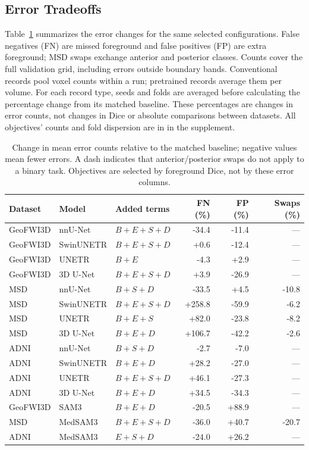 \documentclass[12pt,a4paper]{article}
\begin{document}
\subsection{Error Tradeoffs}
\label{sec:complete-error-tables}
Table~\ref{tab:selected-error-tradeoffs} summarizes the error changes
for the same selected configurations. False negatives (FN) are missed
foreground and false positives (FP) are extra foreground; MSD swaps
exchange anterior and posterior classes. Counts cover the full validation
grid, including errors outside boundary bands. Conventional records pool
voxel counts within a run; pretrained records average them per volume.
For each record type, seeds and folds are averaged before calculating
the percentage change from its matched baseline. These percentages are
changes in error counts, not changes in Dice or absolute comparisons
between datasets. All objectives' counts and fold dispersion are in
 in the supplement.

\begin{table}[htbp]
\centering\footnotesize{}
\setlength{\tabcolsep}{4pt}\renewcommand{\arraystretch}{1.15}
\begin{tabular}{@{}lllrrr@{}}
\hline
Dataset & Model & Added terms & FN (\%) & FP (\%) & Swaps (\%) \\
\hline
GeoFWI3D & nnU-Net & $B+E+S+D$ & -34.4 & -11.4 & --- \\
GeoFWI3D & SwinUNETR & $B+E+S+D$ & +0.6 & -12.4 & --- \\
GeoFWI3D & UNETR & $B+E$ & -4.3 & +2.9 & --- \\
GeoFWI3D & 3D U-Net & $B+E+S+D$ & +3.9 & -26.9 & --- \\
MSD & nnU-Net & $B+S+D$ & -33.5 & +4.5 & -10.8 \\
MSD & SwinUNETR & $B+E+S+D$ & +258.8 & -59.9 & -6.2 \\
MSD & UNETR & $B+E+S$ & +82.0 & -23.8 & -8.2 \\
MSD & 3D U-Net & $B+E+D$ & +106.7 & -42.2 & -2.6 \\
ADNI & nnU-Net & $B+S+D$ & -2.7 & -7.0 & --- \\
ADNI & SwinUNETR & $B+E+D$ & +28.2 & -27.0 & --- \\
ADNI & UNETR & $B+E+S+D$ & +46.1 & -27.3 & --- \\
ADNI & 3D U-Net & $B+E+D$ & +34.5 & -34.3 & --- \\
GeoFWI3D & SAM3 & $B+E+D$ & -20.5 & +88.9 & --- \\
MSD & MedSAM3 & $B+E+S+D$ & -36.0 & +40.7 & -20.7 \\
ADNI & MedSAM3 & $E+S+D$ & -24.0 & +26.2 & --- \\
\hline
\end{tabular}
\caption{Change in mean error counts relative to the matched baseline; negative values mean fewer errors. A dash indicates that anterior/posterior swaps do not apply to a binary task. Objectives are selected by foreground Dice, not by these error columns.}
\label{tab:selected-error-tradeoffs}
\end{table}
\end{document}
